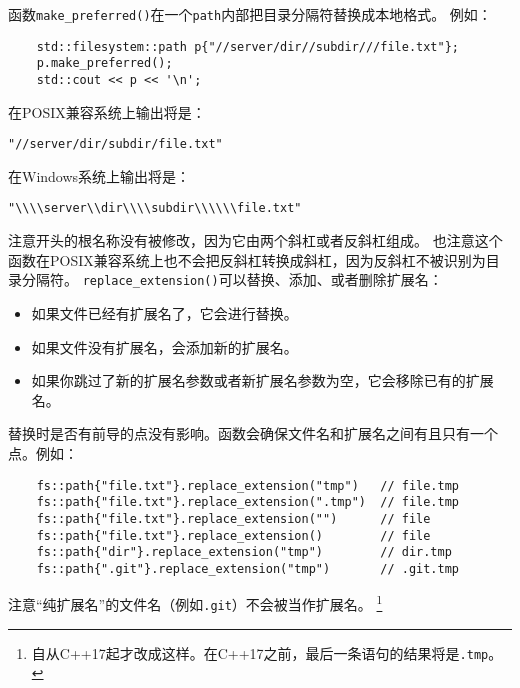 函数\texttt{make\_preferred()}在一个\texttt{path}内部把目录分隔符替换成本地格式。
例如：
\begin{lstlisting}
    std::filesystem::path p{"//server/dir//subdir///file.txt"};
    p.make_preferred();
    std::cout << p << '\n';
\end{lstlisting}
在POSIX兼容系统上输出将是：
\begin{lstlisting}[stringstyle=\color{black}]
    "//server/dir/subdir/file.txt"
\end{lstlisting}
在Windows系统上输出将是：
\begin{lstlisting}[stringstyle=\color{black}]
    "\\\\server\\dir\\\\subdir\\\\\\file.txt"
\end{lstlisting}
注意开头的根名称没有被修改，因为它由两个斜杠或者反斜杠组成。
也注意这个函数在POSIX兼容系统上也不会把反斜杠转换成斜杠，因为反斜杠不被识别为目录分隔符。
\texttt{replace\_extension()}可以替换、添加、或者删除扩展名：
\begin{itemize}
    \item 如果文件已经有扩展名了，它会进行替换。
    \item 如果文件没有扩展名，会添加新的扩展名。
    \item 如果你跳过了新的扩展名参数或者新扩展名参数为空，它会移除已有的扩展名。
\end{itemize}
替换时是否有前导的点没有影响。函数会确保文件名和扩展名之间有且只有一个点。例如：
\begin{lstlisting}
    fs::path{"file.txt"}.replace_extension("tmp")   // file.tmp
    fs::path{"file.txt"}.replace_extension(".tmp")  // file.tmp
    fs::path{"file.txt"}.replace_extension("")      // file
    fs::path{"file.txt"}.replace_extension()        // file
    fs::path{"dir"}.replace_extension("tmp")        // dir.tmp
    fs::path{".git"}.replace_extension("tmp")       // .git.tmp
\end{lstlisting}
注意“纯扩展名”的文件名（例如\texttt{.git}）不会被当作扩展名。
\footnote{自从C++17起才改成这样。在C++17之前，最后一条语句的结果将是\texttt{.tmp}。}

